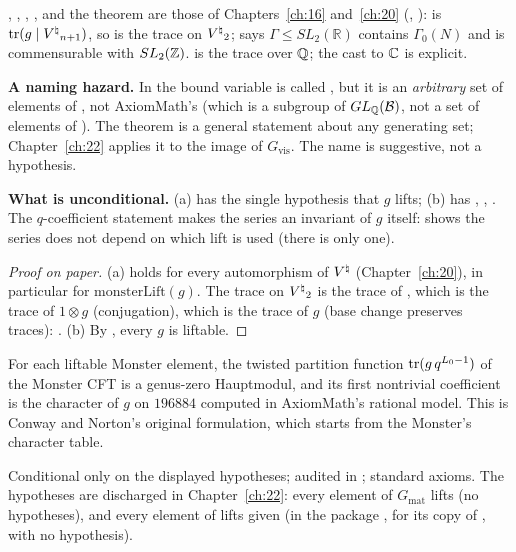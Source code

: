 \begin{dictionary}
, , , ,
 and the theorem  are those of
Chapters~\ref{ch:16} and~\ref{ch:20} (, ):
 is $\operatorname{tr}(g\mid{V^{\natural}}_{n+1})$, so  is the trace on
${V^{\natural}}_2$;  says $\Gamma\le SL_2(\mathbb{R})$ contains $\Gamma_0(N)$ and is commensurable
with $SL_2({\mathbb{Z}})$.   is the trace over ${\mathbb{Q}}$; the cast to ${\mathbb{C}}$ is explicit.

\textbf{A naming hazard.}  In  the bound variable is called
, but it is an \emph{arbitrary} set of elements of , not AxiomMath's
 (which is a subgroup of $GL_{\mathbb{Q}}(\mathcal{B})$, not a set of elements of ).  The
theorem is a general statement about any generating set; Chapter~\ref{ch:22} applies it to the image of
$G_{\mathrm{vis}}$.  The name is suggestive, not a hypothesis.

\textbf{What is unconditional.}  (a) has the single hypothesis that $g$ lifts; (b) has ,
, .  The $q$-coefficient statement makes the series an invariant of $g$ itself:
 shows the series does not depend on which lift is used (there is
only one).
\end{dictionary}
\begin{proof}[Proof on paper]
(a)  holds for every automorphism of ${V^{\natural}}$ (Chapter~\ref{ch:20}), in particular for
$\mathrm{monsterLift}(g)$.  The trace on ${V^{\natural}}_2$ is the trace of , which is the trace of
$1\otimes g$ (conjugation), which is the trace of $g$ (base change preserves traces):
.  (b) By , every $g$ is liftable.
\end{proof}
\begin{physics}
For each liftable Monster element, the twisted partition function $\operatorname{tr}(g\,q^{L_0-1})$ of the Monster CFT
is a genus-zero Hauptmodul, and its first nontrivial coefficient is the character of $g$ on $196884$
computed in AxiomMath's rational model.  This is Conway and Norton's original formulation, which starts
from the Monster's character table.
\end{physics}
\begin{status}
Conditional only on the displayed hypotheses; audited in ;
standard axioms.  The hypotheses are discharged in Chapter~\ref{ch:22}: every element of $G_{\mathrm{mat}}$
lifts (no hypotheses), and every element of  lifts given  (in the package
, for its copy of , with no hypothesis).
\end{status}

